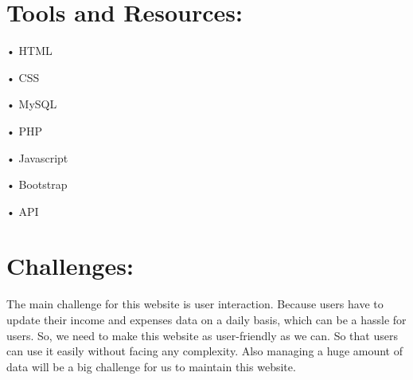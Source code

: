 \documentclass[12pt]{article}
\begin{document}
\section*{Tools and Resources:}
\par
\hspace{0.5cm}
•	HTML
\par
\vspace{0.5cm}
•	CSS
\par
\vspace{0.5cm}
•	MySQL
\par
\vspace{0.5cm}
•	PHP
\par
\vspace{0.5cm}
•	Javascript
\par
\vspace{0.5cm}
•	Bootstrap
\par
\vspace{0.5cm}
•	API
\par
\vspace{0.5cm}

\section*{Challenges:}
\vspace{0.4cm}
\par
The main challenge for this website is user interaction.  Because users have to update their income and expenses data on a daily basis, which can be a hassle for users. So, we need to make this website as user-friendly as we can. So that users can use it easily without facing any complexity. Also managing a huge amount of data will be a big challenge for us to maintain this website. 
\end{document}
